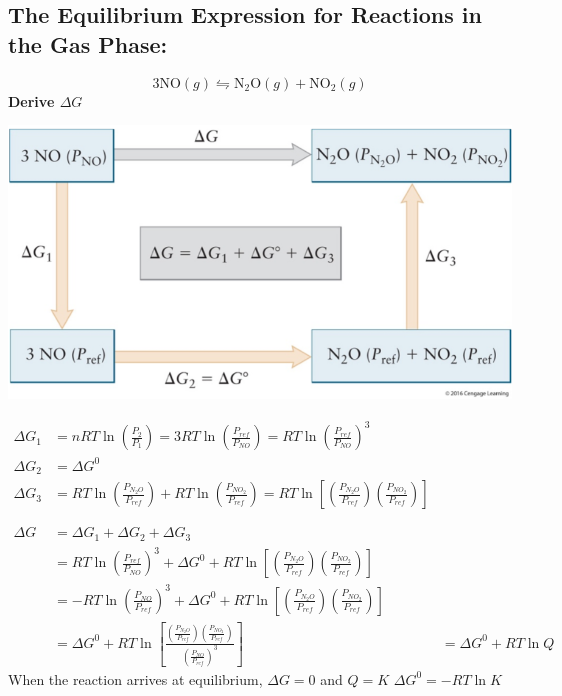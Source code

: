 \documentclass[10pt]{article}
\begin{document}
\subsection*{The Equilibrium Expression for Reactions in the Gas Phase:}
\[3 \text{NO}(g) \leftrightharpoons \text{N}_2\text{O}(g) + \text{NO}_2(g)\]
\textbf{Derive $\Delta G$}
\begin{center}
    \includegraphics*[scale=0.8]{W6_2.png}
\end{center}
\begin{align*}
    \Delta G_1 &= nRT\ln\left(\frac{P_2}{P_1}\right) = 3RT\ln\left(\frac{P_{ref}}{P_{NO}}\right) = RT\ln\left(\frac{P_{ref}}{P_{NO}}\right)^3\\
    \Delta G_2 &= \Delta G^0\\
    \Delta G_3 &= RT\ln\left(\frac{P_{N_2 O}}{P_{ref}}\right) + RT\ln\left(\frac{P_{NO_2}}{P_{ref}}\right) = RT\ln \left[\left(\frac{P_{N_2 O}}{P_{ref}}\right)\left(\frac{P_{NO_2}}{P_{ref}}\right)\right]\\
\\
\\
    \Delta G &= \Delta G_1 + \Delta G_2 + \Delta G_3\\
    &= RT\ln \left(\frac{P_{ref}}{P_{NO}}\right)^3 + \Delta G^0 + RT\ln\left[ \left(\frac{P_{N_2 O}}{P_{ref}}\right)\left(\frac{P_{NO_2}}{P_{ref}}\right)\right]\\
    &= -RT\ln \left(\frac{P_{NO}}{P_{ref}}\right)^3 + \Delta G^0 + RT\ln\left[ \left(\frac{P_{N_2 O}}{P_{ref}}\right)\left(\frac{P_{NO_2}}{P_{ref}}\right)\right]\\
    &= \Delta G^0 + RT\ln\left[\frac{\left(\frac{P_{N_2 O}}{P_{ref}}\right)\left(\frac{P_{NO_2}}{P_{ref}}\right)}{\left(\frac{P_{NO}}{P_{ref}}\right)^3}\right]
    &= \Delta G^0 + RT \ln Q
\end{align*}
When the reaction arrives at equilibrium, $\Delta G = 0$ and $Q = K$
$\Delta G^0 = -RT \ln K$
\end{document}
